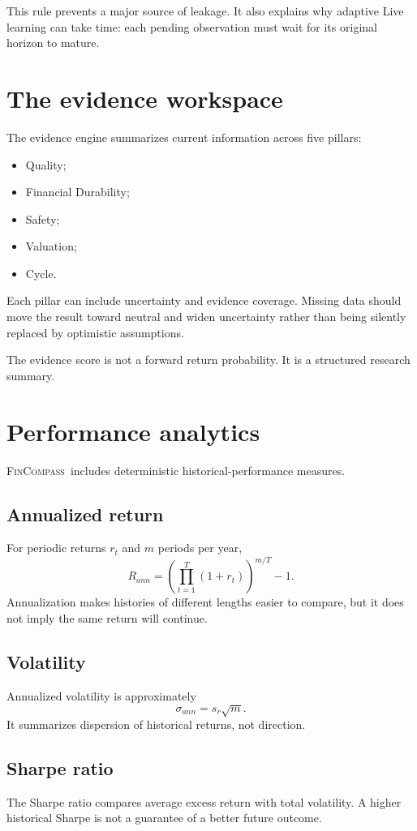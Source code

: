 \documentclass[11pt]{article}
\newcommand{\FC}{\textsc{FinCompass}}
\begin{document}
This rule prevents a major source of leakage. It also explains why adaptive Live learning can take time: each pending observation must wait for its original horizon to mature.

\section{The evidence workspace}
The evidence engine summarizes current information across five pillars:
\begin{itemize}[itemsep=0.15em]
\item Quality;
\item Financial Durability;
\item Safety;
\item Valuation;
\item Cycle.
\end{itemize}
Each pillar can include uncertainty and evidence coverage. Missing data should move the result toward neutral and widen uncertainty rather than being silently replaced by optimistic assumptions.

The evidence score is not a forward return probability. It is a structured research summary.

\section{Performance analytics}
\FC\ includes deterministic historical-performance measures.

\subsection{Annualized return}
For periodic returns $r_t$ and $m$ periods per year,
\begin{equation}
R_{ann}=\left(\prod_{t=1}^{T}(1+r_t)\right)^{m/T}-1.
\end{equation}
Annualization makes histories of different lengths easier to compare, but it does not imply the same return will continue.

\subsection{Volatility}
Annualized volatility is approximately
\begin{equation}
\sigma_{ann}=s_r\sqrt{m}.
\end{equation}
It summarizes dispersion of historical returns, not direction.

\subsection{Sharpe ratio}
The Sharpe ratio compares average excess return with total volatility. A higher historical Sharpe is not a guarantee of a better future outcome.
\end{document}
